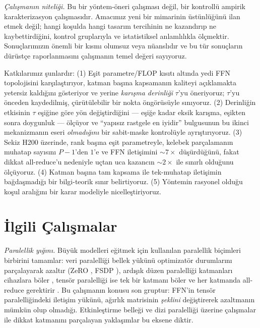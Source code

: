 \documentclass[10pt,journal]{IEEEtran}
\begin{document}
\emph{Çalışmanın niteliği.} Bu bir yöntem-öneri çalışması değil, bir kontrollü ampirik
karakterizasyon çalışmasıdır. Amacımız yeni bir mimarinin üstünlüğünü ilan etmek değil;
hangi koşulda hangi tasarım tercihinin ne kazandırıp ne kaybettirdiğini, kontrol gruplarıyla
ve istatistiksel anlamlılıkla ölçmektir. Sonuçlarımızın önemli bir kısmı olumsuz veya
nüanslıdır ve bu tür sonuçların dürüstçe raporlanmasını çalışmanın temel değeri sayıyoruz.

Katkılarımız şunlardır: (1) Eşit parametre/FLOP kısıtı altında yedi FFN topolojisini
karşılaştırıyor, katman başına kapsamanın kaliteyi açıklamakta yetersiz kaldığını gösteriyor
ve yerine \emph{karışma derinliği} $\tau$'yu öneriyoruz; $\tau$'yu önceden kaydedilmiş,
çürütülebilir bir nokta öngörüsüyle sınıyoruz. (2) Derinliğin etkisinin $\tau$ eşiğine göre
yön değiştirdiğini --- eşiğe kadar eksik karışma, eşikten sonra doygunluk --- ölçüyor ve
``yapısız rastgele en iyidir'' bulgusunun bu ikinci mekanizmanın eseri \emph{olmadığını} bir
sabit-maske kontrolüyle ayrıştırıyoruz. (3) Sekiz H200 üzerinde, rank başına eşit
parametreyle, kelebek parçalamanın muhatap sayısını $P{-}1$'den $1$'e ve FFN iletişimini
$\sim\!7\times$ düşürdüğünü, fakat dikkat all-reduce'u nedeniyle uçtan uca kazancın
$\sim\!2\times$ ile sınırlı olduğunu ölçüyoruz. (4) Katman başına tam kapsama ile tek-muhatap
iletişimin bağdaşmadığı bir bilgi-teorik sınır belirtiyoruz. (5) Yöntemin rasyonel olduğu
koşul aralığını bir karar modeliyle nicelleştiriyoruz.

\section{İlgili Çalışmalar}
\emph{Paralellik yığını.} Büyük modelleri eğitmek için kullanılan paralellik biçimleri
birbirini tamamlar: veri paralelliği bellek yükünü optimizatör durumlarını parçalayarak azaltır
(ZeRO \cite{zero2020}, FSDP \cite{fsdp2023}), ardışık düzen paralelliği katmanları cihazlara
böler \cite{gpipe2019}, tensör paralelliği ise tek bir katmanı böler ve her katmanda
all-reduce gerektirir \cite{megatron2019,narayanan2021}. Bu çalışmanın konusu son gruptur:
FFN'in tensör paralelliğindeki iletişim yükünü, ağırlık matrisinin \emph{şeklini} değiştirerek
azaltmanın mümkün olup olmadığı. Etkinleştirme belleği ve dizi paralelliği üzerine çalışmalar
\cite{korthikanti2023} ile dikkat katmanını parçalayan yaklaşımlar \cite{ringattn2023} bu
eksene diktir.
\end{document}
